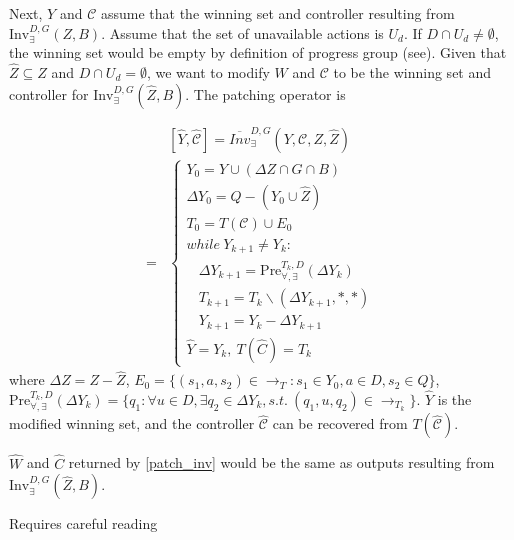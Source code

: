 Next, $ Y $ and $ \mathcal{C} $ assume that  the winning set and controller resulting from $ \text{Inv}_{\exists}^{D,G}(Z,B) $. Assume that the set of unavailable actions is $ U_d $. If $ D\cap U_d \not= \emptyset$, the winning set would be empty by definition of progress group (see\cite{Nilsson2017}). Given that $ \widehat{Z} \subseteq Z $ and $ D\cap U_d=\emptyset $, we want to modify $ W $ and $ \mathcal{C} $ to be the winning set and controller for $ \text{Inv}_{\exists}^{D,G}(\widehat{Z}, B) $. The patching operator is

\begin{align}
&[\widehat{Y},\widehat{\mathcal{C}}]=\overline{Inv}_{\exists}^{D,G}(Y,\mathcal{C},Z,\widehat{Z}) \\
=&\begin{cases}
Y_0 = Y\cup (\Delta Z\cap G \cap B)\\
\Delta Y_0 = Q - (Y_0 \cup \widehat{Z})\\
T_0  = T(\mathcal{C})\cup E_0\\
while \ Y_{k+1}\not= Y_k:\\
\ \ \ \ \Delta Y_{k+1} = \text{Pre}_{\forall,\exists}^{T_k,D}(\Delta Y_k) \\
\ \ \ \ T_{k+1} = T_{k}\backslash (\Delta Y_{k+1},*,*)\\
\ \ \ \ Y_{k+1} = Y_k- \Delta Y_{k+1}\\
\widehat{Y}=Y_k,\ T(\widehat{C}) = T_{k}
\end{cases}\label{patch_inv}
\end{align}
where $ \Delta Z = Z - \widehat{Z} $, $ E_0 = \{(s_1,a,s_2)\in \rightarrow_{T}: s_1\in Y_0, a\in D, s_2 \in Q\} $, $ \text{Pre}_{\forall,\exists}^{T_k,D}(\Delta Y_k) = \{q_1: \forall u\in D, \exists q_2\in \Delta Y_k, s.t.\ (q_1, u, q_2) \in \rightarrow_{T_k} \} $. $ \widehat{Y} $ is the modified winning set, and the controller $ \widehat{\mathcal{C}} $ can be recovered from $ T(\widehat{\mathcal{C}}) $.

\begin{theorem}
$ \widehat{W} $ and $ \widehat{C} $ returned by \eqref{patch_inv} would be the same as outputs resulting from $ \text{Inv}_{\exists}^{D,G}(\widehat{Z},B) $.	
\end{theorem}

{\color{red} Requires careful reading}

